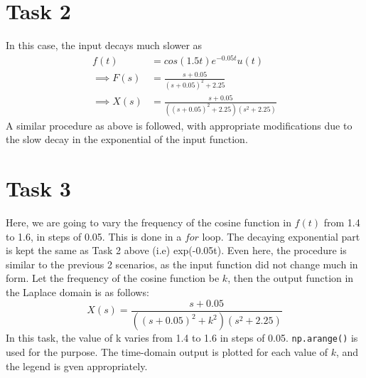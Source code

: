 \documentclass[11pt, a4paper]{article}
\begin{document}
\section{Task 2}
In this case, the input decays much slower as 
\begin{equation*}
\begin{split}
f(t) &= cos(1.5t)e^{-0.05t}u(t)
\\ \implies F(s) &= \frac{s + 0.05}{(s+0.05)^2 + 2.25}
\\ \implies X(s) &= \frac{s + 0.05}{((s+0.05)^2 + 2.25)(s^2 + 2.25)}
\end{split}
\end{equation*}
A similar procedure as above is followed, with appropriate modifications due to the slow decay in the exponential of the input function.

\section{Task 3}
Here, we are going to vary the frequency of the cosine function in \(f(t)\)  from 1.4 to 1.6, in steps of 0.05. This is done in a \(for\) loop. The decaying exponential part is kept the same as Task 2 above (i.e) exp(-0.05t). Even here, the procedure is similar to the previous 2 scenarios, as the input function did not change much in form. Let the frequency of the cosine function be \(k\), then the output function in the Laplace domain is as follows:
\begin{equation*}
 X(s) = \frac{s + 0.05}{((s+0.05)^2 + k ^2)(s^2 + 2.25)}
\end{equation*}
In this task, the value of k varies from 1.4 to 1.6 in steps of 0.05. \texttt{np.arange()} is used for the purpose. The time-domain output is plotted for each value of  \(k\), and the legend is gven appropriately.
\end{document}
